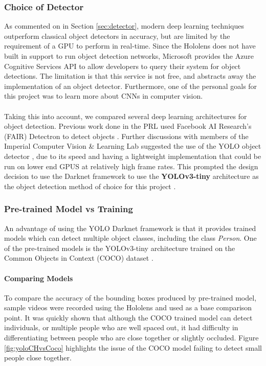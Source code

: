 \subsubsection{Choice of Detector}
As commented on in Section \ref{sec:detector}, modern deep learning techniques outperform classical object detectors in accuracy, but are limited by the requirement of a GPU to perform in real-time. Since the Hololens does not have built in support to run object detection networks, Microsoft provides the Azure Cognitive Services API to allow developers to query their system for object detections. The limitation is that this service is not free, and abstracts away the implementation of an object detector. Furthermore, one of the personal goals for this project was to learn more about CNNs in computer vision.

\paragraph{} Taking this into account, we compared several deep learning architectures for object detection. Previous work done in the PRL used Facebook AI Research's (FAIR) Detectron to detect objects \cite{Chacon-Quesada, Detectron2018, Rena}. Further discussions with members of the Imperial Computer Vision \& Learning Lab suggested the use of the YOLO object detector \cite{Redmon}, due to its speed and having a lightweight implementation that could be run on lower end GPUS at relatively high frame rates. This prompted the design decision to use the Darknet framework to use the \textbf{YOLOv3-tiny} architecture as the object detection method of choice for this project \cite{Redmon2018}.

\subsubsection{Pre-trained Model vs Training} \label{sec:designYOLO}
An advantage of using the YOLO Darknet framework is that it provides trained models which can detect multiple object classes, including the class \textit{Person}. One of the pre-trained models is the YOLOv3-tiny architecture trained on the Common Objects in Context (COCO) dataset \cite{Lin}.

\paragraph{Comparing Models} To compare the accuracy of the bounding boxes produced by pre-trained model, sample videos were recorded using the Hololens and used as a base comparison point. It was quickly shown that although the COCO trained model can detect individuals, or multiple people who are well spaced out, it had difficulty in differentiating between people who are close together or slightly occluded. Figure \ref{fig:yoloCHvsCoco} highlights the issue of the COCO model failing to detect small people close together.

